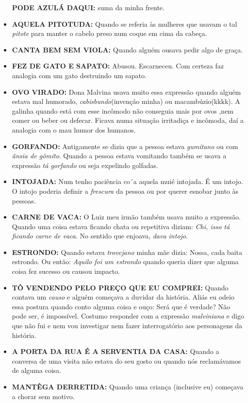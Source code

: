 \documentclass[12pt,brazil,]{book}
\begin{document}
\begin{itemize}
  \textbf{PODE AZULÁ DAQUI:} suma da minha frente.\\
\item
  \textbf{AQUELA PITOTUDA:} Quando se referia às mulheres que usavam o
  tal \emph{pitote} para manter o cabelo preso num coque em cima da
  cabeça.\\
\item
  \textbf{CANTA BEM SEM VIOLA:} Quando alguém ousava pedir algo de
  graça.\\
\item
  \textbf{FEZ DE GATO E SAPATO:} Abusou. Escarneceu. Com certeza faz
  analogia com um gato destruindo um sapato.\\
\item
  \textbf{OVO VIRADO:} Dona Malvina usava muito essa expressão quando
  alguém estava mal humorado, \emph{cabisbundo}(invenção minha) ou
  macambúzio(kkkk). A galinha quando está com esse incômodo não
  conseguia mais por ovos ,nem comer ou beber ou defecar. Ficava numa
  situação irritadiça e incômoda, daí a analogia com o mau humor dos
  humanos.\\
\item
  \textbf{GORFANDO:} Antigamente se dizia que a pessoa estava
  \emph{gumitano} ou com \emph{ânsia de gômito}. Quando a pessoa estava
  vomitando também se usava a expressão \emph{tá gorfando} ou seja
  expelindo golfadas.\\
\item
  \textbf{INTOJADA:} Num tenho paciência co´a aquela muié intojada. É um
  intojo. O intojo poderia definir a \emph{frescura} da pessoa ou por
  querer esnobar junto às pessoas.\\
\item
  \textbf{CARNE DE VACA:} O Luiz meu irmão também usava muito a
  expressão. Quando uma coisa estava ficando chata ou repetitiva diziam:
  \emph{Chi, isso tá ficando carne de vaca}. No sentido que enjoava,
  \emph{dava intojo}.\\
\item
  \textbf{ESTRONDO:} Quando estava \emph{trovejano} minha mãe dizia:
  Nossa, cada baita estrondo. Ou então: \emph{Aquilo foi um estrondo}
  quando queria dizer que alguma coisa fez sucesso ou causou impacto.\\
\item
  \textbf{TÔ VENDENDO PELO PREÇO QUE EU COMPREI:} Quando contava um
  \emph{causo} e alguém começava a duvidar da história. Aliás eu odeio
  essa postura quando conto alguma coisa e ouço: Será que é verdade? Não
  pode ser, é impossível. Costumo responder com a expressão
  \emph{malviniana} e digo que não fui e nem vou investigar nem fazer
  interrogatório aos personagens da história.\\
\item
  \textbf{A PORTA DA RUA É A SERVENTIA DA CASA:} Quando a conversa de
  uma visita não estava do seu gosto ou quando nós reclamávamos de
  alguma coisa.\\
\item
  \textbf{MANTÊGA DERRETIDA:} Quando uma criança (inclusive eu) começava
  a chorar sem motivo.
\end{itemize}
\end{document}
